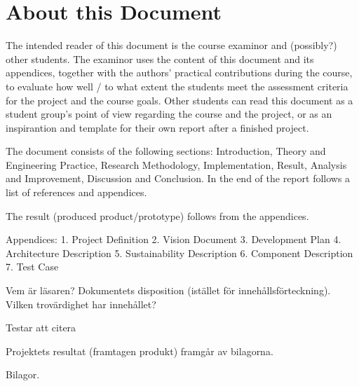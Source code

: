 \section{About this Document}
The intended reader of this document is the course examinor and (possibly?) other students. The examinor uses the content of this document and its appendices, together with the authors' practical contributions during the course, to evaluate how well / to what extent the students meet the assessment criteria for the project and the course goals. Other students can read this document as a student group's point of view regarding the course and the project, or as an inspirantion and template for their own report after a finished project. 

The document consists of the following sections: Introduction, Theory and Engineering Practice, Research Methodology, Implementation, Result, Analysis and Improvement, Discussion and Conclusion. In the end of the report follows a list of references and appendices. 

The result (produced product/prototype) follows from the appendices. 

Appendices: 
1. Project Definition 
2. Vision Document 
3. Development Plan
4. Architecture Description
5. Sustainability Description 
6. Component Description 
7. Test Case 



Vem är läsaren? Dokumentets disposition (istället för innehållsförteckning). Vilken trovärdighet har innehållet?

Testar att citera \cite{eklund_arbeta_2010}

Projektets resultat (framtagen produkt) framgår av bilagorna.

Bilagor.